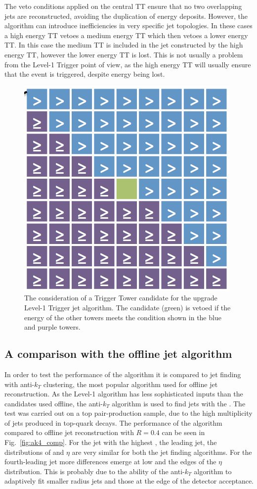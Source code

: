 The veto conditions applied on the central TT ensure that no two
overlapping jets are reconstructed, avoiding the duplication of energy
deposits. However, the algorithm can introduce inefficiencies in very
specific jet topologies. In these cases a high energy TT vetoes a
medium energy TT which then vetoes a lower energy TT. In this case the
medium TT is included in the jet constructed by the high energy TT,
however the lower energy TT is lost. This is not usually a problem
from the Level-1 Trigger point of view, as the high energy TT will
usually ensure that the event is triggered, despite energy being lost.

\begin{figure}
	\begin{center}
		\includegraphics[width=0.4\linewidth]{figs/trigger/stage2_jetalgo}
  \end{center} \caption{The consideration of a Trigger Tower candidate
  for the upgrade Level-1 Trigger jet algorithm. The candidate (green)
  is vetoed if the energy of the other towers meets the condition
  shown in the blue and purple towers.}
	\label{fig:stage2_jetalgo}
\end{figure}

\subsection{A comparison with the offline jet algorithm}

In order to test the performance of the algorithm it is compared to
jet finding with anti-$k_T$ clustering, the most popular algorithm
used for offline jet reconstruction. As the Level-1 algorithm has less
sophisticated inputs than the \PF candidates used offline, the
anti-$k_T$ algorithm is used to find jets with the \TT. The test was
carried out on a top pair-production \MC sample, due to the high
multiplicity of jets produced in top-quark decays. The performance of
the algorithm compared to offline jet reconstruction with $R=0.4$ can
be seen in Fig.~\ref{fig:ak4_comp}. For the jet with the highest \pT,
the leading jet, the distributions of \pT and $\eta$ are very similar
for both the jet finding algorithms. For the fourth-leading jet more
differences emerge at low \pT and the edges of the $\eta$
distribution. This is probably due to the ability of the anti-$k_T$
algorithm to adaptively fit smaller radius jets and those at the edge
of the detector acceptance.

